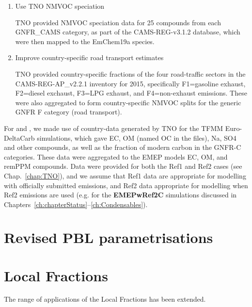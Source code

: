 \begin{enumerate}
  \item Use TNO NMVOC speciation

    TNO provided NMVOC speciation data for 25 compounds from each
    GNFR\_CAMS category, as part of the CAMS-REG-v3.1.2 database,
    which were then mapped to the EmChem19a species.

  \item Improve country-specific road transport estimates

    TNO provided country-specific fractions of the four road-traffic
    sectors in the CAMS-REG-AP\_v2.2.1 inventory for 2015, specifically
    F1=gasoline exhaust, F2=diesel exchaust, F3=LPG exhaust, and
    F4=non-exhaust emissions. These were also aggregated to form
    country-specific NMVOC splits for the generic GNFR F category
    (road transport).

\end{enumerate}


For \pmfine and \pmten, we made use of country-data generated by TNO for
the TFMM Euro-DeltaCarb simulations, which gave EC, OM (named
OC in the files), Na, SO4 and other compounds, as well as the fraction
of modern carbon in the GNFR-C categories. These data were aggregated
to the EMEP models EC, OM, and remPPM compounds. Data were provided for
both the Ref1 and Ref2 cases (see Chap.~\ref{chap:TNO}), and we assume
that Ref1 data are appropriate for modelling with officially submitted
emissions, and Ref2 data appropriate for modelling when Ref2 emissions
are used (e.g. for the \textbf{EMEPwRef2C} simulations discussed in
Chapters~\ref{ch:chapterStatus}--\ref{ch:Condensables}).



\section{Revised PBL parametrisations}
\label{sec:updateKz}


\section{Local Fractions}
\label{sec:updateLF}
The range of applications of the Local Fractions has been extended. 


